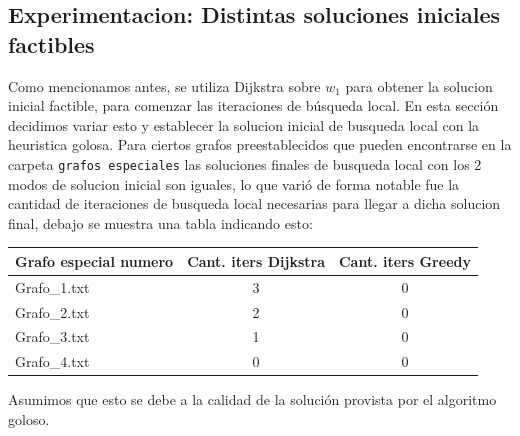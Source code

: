 \subsection{Experimentacion: Distintas soluciones iniciales factibles}
Como mencionamos antes, se utiliza Dijkstra sobre $w_1$ para obtener la solucion inicial factible, para comenzar las iteraciones de b\'usqueda local. En esta secci\'on decidimos variar esto y establecer la solucion inicial de busqueda local con la heuristica golosa. Para ciertos grafos preestablecidos que pueden encontrarse en la carpeta \texttt{grafos especiales} las soluciones finales de busqueda local con los 2 modos de solucion inicial son iguales, lo que vari\'o de forma notable fue la cantidad de iteraciones de busqueda local necesarias para llegar a dicha solucion final, debajo se muestra una tabla indicando esto:
\begin{center}
	\begin{tabular}{ | l | c | c |}
	  Grafo especial numero & Cant. iters Dijkstra & Cant. iters Greedy \\
	  \hline
	  Grafo\_1.txt & 3 & 0 \\
	  \hline
	  Grafo\_2.txt & 2 & 0 \\
	  \hline
	  Grafo\_3.txt & 1 & 0 \\
	  \hline
	  Grafo\_4.txt & 0 & 0 \\
	  \hline
	\end{tabular}
\end{center}

Asumimos que esto se debe a la calidad de la soluci\'on provista por el algoritmo goloso.